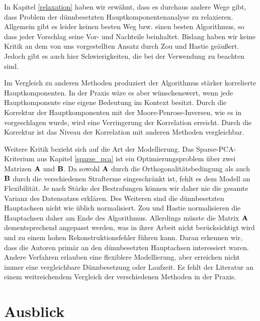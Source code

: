 In Kapitel \ref{relaxation} haben wir erwähnt, dass es durchaus andere Wege gibt, dass Problem der dünnbesetzten Hauptkomponentenanalyse zu relaxieren. Allgemein gibt es leider keinen besten Weg bzw. einen besten Algorithmus, so dass jeder Vorschlag seine Vor- und Nachteile beinhaltet. Bislang haben wir keine Kritik an dem von uns vorgestellten Ansatz durch Zou und Hastie \cite{zou_sparsepca} geäußert. Jedoch gibt es auch hier Schwierigkeiten, die bei der Verwendung zu beachten sind. 

Im Vergleich zu anderen Methoden produziert der Algorithmus stärker korrelierte Hauptkomponenten. In der Praxis wäre es aber wünschenswert, wenn jede Hauptkomponente eine eigene Bedeutung im Kontext besitzt. Durch die Korrektur der Hauptkomponenten mit der Moore-Penrose-Inversen, wie es in \cite{camacho} vorgeschlagen wurde, wird eine Verringerung der Korrelation erreicht. Durch die Korrektur ist das Niveau der Korrelation mit anderen Methoden vergleichbar. 

Weitere Kritik bezieht sich auf die Art der Modellierung. Das Sparse-PCA-Kriterium aus Kapitel \ref{sparse_pca} ist ein Optimierungsproblem über zwei Matrizen $\mathbf{A}$ und $\mathbf{B}$. Da sowohl $\mathbf{A}$ durch die Orthogonalitätsbedingung als auch $\mathbf{B}$ durch die verschiedenen Strafterme eingeschränkt ist, fehlt es dem Modell an Flexibilität. Je nach Stärke der Bestrafungen können wir daher nie die gesamte Varianz des Datensatzes erklären. Des Weiteren sind die dünnbesetzten Hauptachsen nicht wie üblich normalisiert. Zou und Hastie normalisieren die Hauptachsen daher am Ende des Algorithmus. Allerdings müsste die Matrix $\mathbf{A}$ dementsprechend angepasst werden, was in ihrer Arbeit nicht berücksichtigt wird und zu einem hohen Rekonstruktionsfehler führen kann. Daran erkennen wir, dass die Autoren primär an den dünnbesetzten Hauptachsen interessiert waren. Andere Verfahren erlauben eine flexiblere Modellierung, aber erreichen nicht immer eine vergleichbare Dünnbesetzung oder Laufzeit. Es fehlt der Literatur an einem weitreichendem Vergleich der verschiedenen Methoden in der Praxis.




\section{Ausblick}

